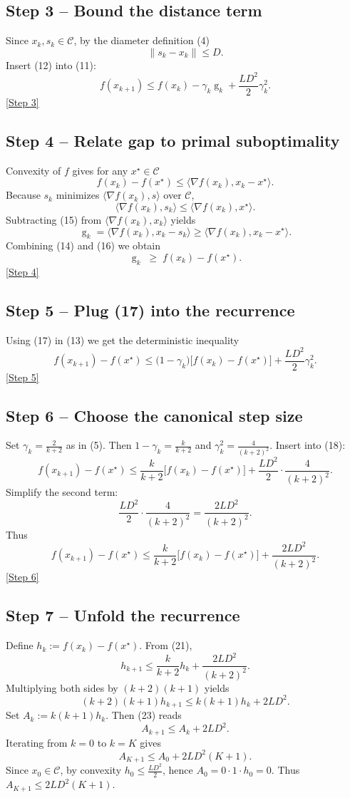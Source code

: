 \documentclass{article}
\newcommand{\gap}{\operatorname{g}}
\begin{document}
\subsection*{Step 3 – Bound the distance term}
Since $x_k,s_k\in\mathcal{C}$, by the diameter definition (4)
\[
\|s_k-x_k\|\le D .
\tag{12}
\]
Insert (12) into (11):
\[
f(x_{k+1}) \le f(x_k)-\gamma_k\gap_k+\frac{L D^{2}}{2}\gamma_k^{2}.
\tag{13}
\]
\underline{[Step 3]}

\subsection*{Step 4 – Relate gap to primal suboptimality}
Convexity of $f$ gives for any $x^\star\in\mathcal{C}$
\[
f(x_k)-f(x^\star) \le \langle\nabla f(x_k),x_k-x^\star\rangle .
\tag{14}
\]
Because $s_k$ minimizes $\langle\nabla f(x_k),s\rangle$ over $\mathcal{C}$,
\[
\langle\nabla f(x_k),s_k\rangle \le \langle\nabla f(x_k),x^\star\rangle .
\tag{15}
\]
Subtracting (15) from $\langle\nabla f(x_k),x_k\rangle$ yields
\[
\gap_k = \langle\nabla f(x_k),x_k-s_k\rangle
       \ge \langle\nabla f(x_k),x_k-x^\star\rangle .
\tag{16}
\]
Combining (14) and (16) we obtain
\[
\gap_k \;\ge\; f(x_k)-f(x^\star).
\tag{17}
\]
\underline{[Step 4]}

\subsection*{Step 5 – Plug (17) into the recurrence}
Using (17) in (13) we get the deterministic inequality
\[
f(x_{k+1})-f(x^\star)
\le \bigl(1-\gamma_k\bigr)\bigl[f(x_k)-f(x^\star)\bigr]
   +\frac{L D^{2}}{2}\gamma_k^{2}.
\tag{18}
\]
\underline{[Step 5]}

\subsection*{Step 6 – Choose the canonical step size}
Set $\displaystyle\gamma_k=\frac{2}{k+2}$ as in (5).  
Then $1-\gamma_k = \frac{k}{k+2}$ and $\gamma_k^{2}= \frac{4}{(k+2)^{2}}$.  
Insert into (18):
\[
f(x_{k+1})-f(x^\star)
\le \frac{k}{k+2}\bigl[f(x_k)-f(x^\star)\bigr]
   +\frac{L D^{2}}{2}\cdot\frac{4}{(k+2)^{2}} .
\tag{19}
\]
Simplify the second term:
\[
\frac{L D^{2}}{2}\cdot\frac{4}{(k+2)^{2}}
   =\frac{2L D^{2}}{(k+2)^{2}} .
\tag{20}
\]
Thus
\[
f(x_{k+1})-f(x^\star)
\le \frac{k}{k+2}\bigl[f(x_k)-f(x^\star)\bigr]
   +\frac{2L D^{2}}{(k+2)^{2}} .
\tag{21}
\]
\underline{[Step 6]}

\subsection*{Step 7 – Unfold the recurrence}
Define $h_k:=f(x_k)-f(x^\star)$.  
From (21),
\[
h_{k+1} \le \frac{k}{k+2}h_k + \frac{2L D^{2}}{(k+2)^{2}} .
\tag{22}
\]
Multiplying both sides by $(k+2)(k+1)$ yields
\[
(k+2)(k+1)h_{k+1}
\le k(k+1)h_k + 2L D^{2} .
\tag{23}
\]
Set $A_k:=k(k+1)h_k$.  Then (23) reads
\[
A_{k+1} \le A_k + 2L D^{2}.
\tag{24}
\]
Iterating from $k=0$ to $k=K$ gives
\[
A_{K+1} \le A_0 + 2L D^{2}(K+1).
\tag{25}
\]
Since $x_0\in\mathcal{C}$, by convexity $h_0\le \frac{L D^{2}}{2}$, hence $A_0 =0\cdot1\cdot h_0 =0$.  
Thus $A_{K+1}\le 2L D^{2}(K+1)$.
\end{document}
